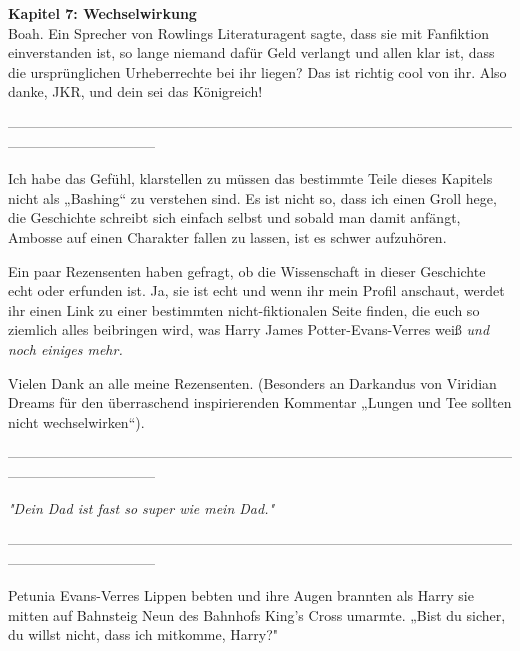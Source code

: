 

\hypertarget{wechselwirkung}{%

\textbf{Kapitel 7: Wechselwirkung}\\

\hfill\break Boah. Ein Sprecher von Rowlings Literaturagent sagte, dass sie mit Fanfiktion einverstanden ist, so lange niemand dafür Geld verlangt und allen klar ist, dass die ursprünglichen Urheberrechte bei ihr liegen? Das ist richtig cool von ihr. Also danke, JKR, und dein sei das Königreich!

--------------------------------------------------------------------------------------------------------------------------------------------

\hfill\break Ich habe das Gefühl, klarstellen zu müssen das bestimmte Teile dieses Kapitels nicht als „Bashing“ zu verstehen sind. Es ist nicht so, dass ich einen Groll hege, die Geschichte schreibt sich einfach selbst und sobald man damit anfängt, Ambosse auf einen Charakter fallen zu lassen, ist es schwer aufzuhören.

Ein paar Rezensenten haben gefragt, ob die Wissenschaft in dieser Geschichte echt oder erfunden ist. Ja, sie ist echt und wenn ihr mein Profil anschaut, werdet ihr einen Link zu einer bestimmten nicht-fiktionalen Seite finden, die euch so ziemlich alles beibringen wird, was Harry James Potter-Evans-Verres weiß \emph{und noch einiges mehr.}

Vielen Dank an alle meine Rezensenten. (Besonders an Darkandus von Viridian Dreams für den überraschend inspirierenden Kommentar „Lungen und Tee sollten nicht wechselwirken“).

--------------------------------------------------------------------------------------------------------------------------------------------

\hfill\break

\emph{\emph{"Dein Dad ist fast so super wie mein Dad."}}

\hfill\break

--------------------------------------------------------------------------------------------------------------------------------------------

\hfill\break Petunia Evans-Verres Lippen bebten und ihre Augen brannten als Harry sie mitten auf Bahnsteig Neun des Bahnhofs King's Cross umarmte. „Bist du sicher, du willst nicht, dass ich mitkomme, Harry?"

}

